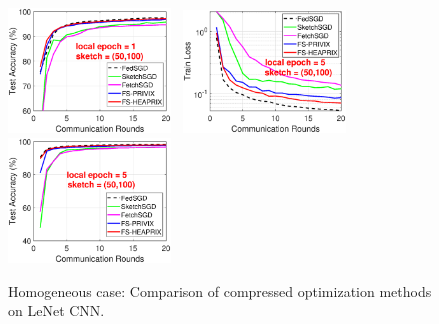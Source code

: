 \documentclass{article}
\begin{document}
\begin{figure}[t]
\begin{center}
{		\includegraphics[width=1.7in]{MNIST_figures/local1_sketch50_iid1_test_acc.eps} 
		}
		\mbox{\hspace{-0.15in}	
		\includegraphics[width=1.7in]{MNIST_figures/local5_sketch50_iid1_train_loss.eps}\hspace{-0.12in}
		\includegraphics[width=1.7in]{MNIST_figures/local5_sketch50_iid1_test_acc.eps}
		}
	\end{center}
	\vspace{-0.1in}
	\caption{Homogeneous case: Comparison of compressed optimization methods on LeNet CNN.}
    \label{fig:MNIST-iid1}
    \vspace{-0.1in}
\end{figure}
\end{document}
